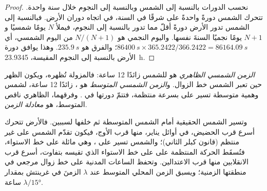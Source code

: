 \begin{proof}
نحسب الدورات بالنسبة إلى الشمس وبالنسبة إلى النجوم خلال سنة واحدة. تتحرك الشمس دورةً واحدةً على  شرقًا في السنة، في اتجاه دوران الأرض. فبالنسبة إلى الشمس تدور الأرض دورةً أقلّ مما تدور بالنسبة إلى النجوم، فيملأ $N$ يومًا شمسيًا و$N + 1$ يومًا نجميًا السنةَ نفسها. واليوم النجمي هو $N/(N+1)$ من اليوم الشمسي، أي $\qty{86400}{s}\times 365.2422/366.2422 = \qty{86164.09}{s}$؛ والفرق هو $\qty{235.9}{s}$. وهذا يوافق دورة الأرض بالنسبة إلى النجوم المقيسة، \qty{23.9345}{h}.
\end{proof}

\begin{definition}\label{def:b1:spherical-astronomy:solar-time}
\emph{الزمن الشمسي الظاهري} هو  للشمس زائدًا 12 ساعة: فالمزولة تُظهره، ويكون الظهر حين تعبر الشمس خط الزوال. و\emph{الزمن الشمسي المتوسط} هو ، زائدًا 12 ساعة، لشمس وهمية متوسطة تسير على  بسرعة منتظمة، فتتمّ دورتها في . وفرقهما، الظاهري ناقص المتوسط، هو \emph{معادلة الزمن}.
\end{definition}

وتسير الشمس الحقيقية أمام الشمس المتوسطة ثم خلفها لسببين. فالأرض تتحرك أسرع قرب الحضيض، في أوائل يناير، منها قرب الأوج، فيكون تقدّم الشمس على  غير منتظم (قانون كبلر الثاني)؛ والشمس تسير على ، وهي مائلة على خط الاستواء، فتُسقَط الحركة المنتظمة على  على خط الاستواء الذي تقيسه  بتفاوت، أسرع قرب الانقلابين منها قرب الاعتدالين. وتحفظ الساعات المدنية  على خط زوال مرجعي في منطقتها الزمنية؛ ويسبق الزمن المحلي المتوسط عند  $\lambda$ الزمنَ في غرينتش بمقدار $\lambda/\ang{15}$ ساعة.

